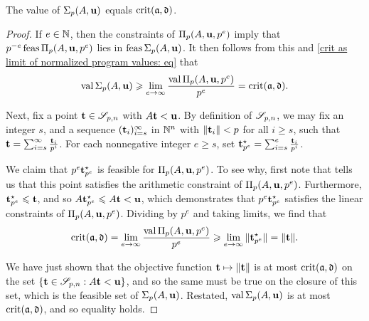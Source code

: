 \documentclass{amsart}
\begin{document}
\begin{example}

\end{example}

\begin{proposition}
   The value of $\Sigma_p(A,\mathbf{u})$ equals $\operatorname{crit}(\mathfrak{a}, \mathfrak{d})$.
\end{proposition}

\begin{proof}
   If $e \in \mathbb{N}$, then the constraints of $\Pi_p(A, \mathbf{u}, p^e)$ imply that $p^{-e}  \operatorname{feas} \Pi_p(A, \mathbf{u}, p^e)$ lies in $\operatorname{feas} \Sigma_p(A,\mathbf{u})$.
   It then follows from this and \eqref{crit as limit of normalized program values: eq} that
   \[
      \operatorname{val}\Sigma_p(A,\mathbf{u}) \geqslant \displaystyle \lim_{e \to \infty}\frac{\operatorname{val}\Pi_p(A,\mathbf{u}, p^e)}{p^e} = \operatorname{crit}(\mathfrak{a}, \mathfrak{d}).
   \]

   Next, fix a point $\mathbf{t} \in \mathscr{S}_{p,n}$ with $A \mathbf{t} < \mathbf{u}$.
   By definition of $\mathscr{S}_{p,n}$, we may fix an integer $s$, and a sequence $( \mathbf{t}_i )_{i=s}^\infty$ in $\mathbb{N}^n$ with $\| \mathbf{t}_i \| < p$ for all $i \geq s$, such that $\mathbf{t} = \sum_{i=s}^{\infty} \frac{\mathbf{t}_i}{p^i}$.
   For each nonnegative integer $e \geq s$, set $\mathbf{t}^\star_{p^e} = \sum_{i=s}^{e} \frac{\mathbf{t}_i}{p^i}$.

   We claim that $p^e  \mathbf{t}^\star_{p^e}$ is feasible for $\Pi_p(A, \mathbf{u}, p^e)$.
   To see why, first note that  tells us that this point satisfies the arithmetic constraint of $\Pi_p(A, \mathbf{u}, p^e)$.
   Furthermore, $\mathbf{t}^{\star}_{p^e} \leqslant \mathbf{t}$, and so $A \mathbf{t}^{\star}_{p^e} \leqslant A \mathbf{t} < \mathbf{u}$, which demonstrates that $p^e \mathbf{t}^\star_{p^e}$ satisfies the linear constraints of $\Pi_p(A, \mathbf{u}, p^e)$.
   Dividing by $p^e$ and taking limits, we find that
   \[
      \operatorname{crit}(\mathfrak{a}, \mathfrak{d}) = \lim_{e \to \infty} \frac{\operatorname{val} \Pi_p(A, \mathbf{u}, p^e)}{p^e} \geqslant \lim_{e \to \infty}   \| \mathbf{t}^\star_{p^e} \| = \| \mathbf{t} \|.
   \]

   We have just shown that the objective function $\mathbf{t} \mapsto \| \mathbf{t} \|$ is at most $\operatorname{crit}(\mathfrak{a}, \mathfrak{d})$ on the set $\{ \mathbf{t} \in \mathscr{S}_{p,n} : A \mathbf{t} < \mathbf{u} \}$, and so the same must be true on the closure of this set, which is the feasible set of $\Sigma_p(A, \mathbf{u})$.
   Restated,  $ \operatorname{val} \Sigma_p(A, \mathbf{u})$ is at most $\operatorname{crit}(\mathfrak{a},  \mathfrak{d})$, and so equality holds.
\end{proof}
\end{document}
